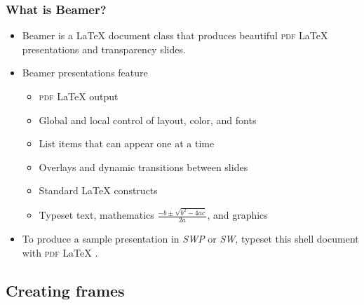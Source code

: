 \documentclass[notes=show]{beamer}%
\newenvironment{stepitemize}{\begin{itemize}[<+->]}{\end{itemize} }
\begin{document}
\begin{frame}%
%

\frametitle{What is Beamer?}%


\begin{itemize}
\item Beamer is a
\LaTeX{}
document class that produces beautiful \textsc{pdf}%
\LaTeX{}
presentations and transparency slides.

\item Beamer presentations feature

\begin{stepitemize}
\item \textsc{pdf}%
\LaTeX{}
output

\item Global and local control of layout, color, and fonts

\item List items that can appear one at a time

\item Overlays and dynamic transitions between slides

\item Standard
\LaTeX{}
constructs

\item Typeset text, mathematics $\frac{-b\pm\sqrt{b^{2}-4ac}}{2a}$, and graphics
\end{stepitemize}

\item To produce a sample presentation in \textsl{SWP }or \textsl{SW}, typeset
this shell document with \textsc{pdf}%
\LaTeX{}
.
\end{itemize}%

\end{frame}%


\subsection{Creating frames}%
\end{document}
